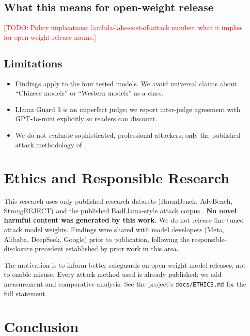 \documentclass[11pt,letterpaper]{article}
\newcommand{\TODO}[1]{\textcolor{red}{[TODO: #1]}}
\begin{document}
\subsection{What this means for open-weight release}

\TODO{Policy implications: lambda-labs-cost-of-attack number, what it
implies for open-weight release norms.}

\subsection{Limitations}

\begin{itemize}
  \item Findings apply to the four tested models. We avoid universal
        claims about ``Chinese models'' or ``Western models'' as a class.
  \item Llama Guard 3 is an imperfect judge; we report inter-judge
        agreement with GPT-4o-mini explicitly so readers can discount.
  \item We do not evaluate sophisticated, professional attackers; only
        the published attack methodology of \citet{qi2023finetuning}.
\end{itemize}

\section{Ethics and Responsible Research}
\label{sec:ethics}

This research uses only published research datasets (HarmBench, AdvBench,
StrongREJECT) and the published BadLlama-style attack corpus
\citep{gade2023badllama}. \textbf{No novel harmful content was generated by
this work.} We do not release fine-tuned attack model weights. Findings
were shared with model developers (Meta, Alibaba, DeepSeek, Google) prior
to publication, following the responsible-disclosure precedent established
by prior work in this area.

The motivation is to inform better safeguards on open-weight model
releases, not to enable misuse. Every attack method used is already
published; we add measurement and comparative analysis. See the project's
\texttt{docs/ETHICS.md} for the full statement.

\section{Conclusion}
\end{document}
